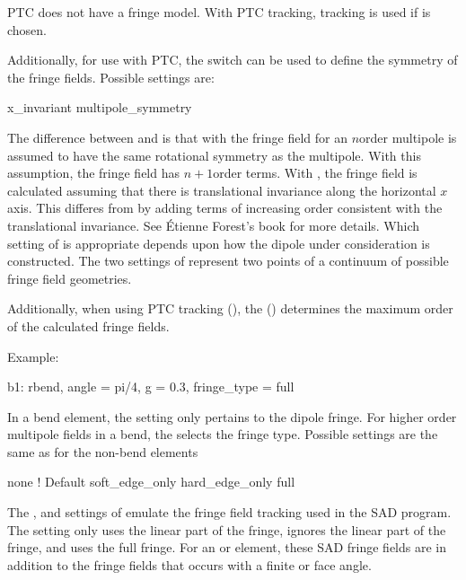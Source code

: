 PTC does not have a  fringe model.
With PTC tracking,  tracking is used if  is chosen.

Additionally, for use with PTC, the  switch can be used
to define the symmetry of the fringe fields. Possible settings are:
\begin{example}
  x_invariant
  multipole_symmetry
\end{example}
The difference between  and  is
that with  the fringe field for an $n$\Th order
multipole is assumed to have the same rotational symmetry as the
multipole. With this assumption, the fringe field has $n+1$\St order
terms.  With , the fringe field is calculated assuming
that there is translational invariance along the horizontal $x$
axis. This differes from  by adding terms of
increasing order consistent with the translational invariance. See
\'Etienne Forest's book\cite{b:forest} for more details. Which setting
of  is appropriate depends upon how the dipole
under consideration is constructed. The two settings of
 represent two points of a continuum of
possible fringe field geometries.

Additionally, when using PTC tracking (), the
 () determines the
maximum order of the calculated fringe fields.

Example:
\begin{example}
  b1: rbend, angle = pi/4, g = 0.3, fringe_type = full
\end{example}

In a bend element, the  setting only pertains to the
dipole fringe.  For higher order multipole fields in a bend, the
 selects the fringe type. Possible
settings are the same as for the non-bend  elements
\begin{example}
  none              ! Default 
  soft_edge_only
  hard_edge_only
  full
\end{example}

The ,  and  settings
of  emulate the fringe field tracking used in the SAD
program\cite{b:sad}.  The  setting only uses the linear
part of the fringe,  ignores the linear part of
the fringe, and  uses the full fringe.  For an 
or  element, these SAD fringe fields are in addition to the
fringe fields that occurs with a finite  or  face
angle. 

